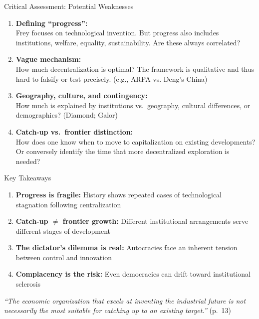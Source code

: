 \documentclass[aspectratio=169, 11pt]{beamer}
\begin{document}
\begin{frame}{Critical Assessment: Potential Weaknesses}
    \begin{enumerate}
        \item \textbf{Defining ``progress'':} \\
        \small Frey focuses on technological invention. But progress also includes institutions, welfare, equality, sustainability. Are these always correlated?

        \item \textbf{Vague mechanism:} \\
        \small How much decentralization is optimal? The framework is qualitative and thus hard to falsify or test precisely. (e.g., ARPA vs. Deng's China)

        \item \textbf{Geography, culture, and contingency:} \\
        \small How much is explained by institutions vs.\ geography, cultural differences, or demographics? (Diamond; Galor)

        \item \textbf{Catch-up vs.\ frontier distinction:} \\
        \small How does one know when to move to capitalization on existing developments? Or conversely identify the time that more decentralized exploration is needed?
    \end{enumerate}
\end{frame}



\begin{frame}{Key Takeaways}
    \begin{enumerate}
        \item \textbf{Progress is fragile:} History shows repeated cases of technological stagnation following centralization
        \item \textbf{Catch-up $\neq$ frontier growth:} Different institutional arrangements serve different stages of development
        \item \textbf{The dictator's dilemma is real:} Autocracies face an inherent tension between control and innovation
        \item \textbf{Complacency is the risk:} Even democracies can drift toward institutional sclerosis
    \end{enumerate}

    \vspace{1em}

    \begin{center}
        \textit{``The economic organization that excels at inventing the industrial future is not necessarily the most suitable for catching up to an existing target.''} (p.\ 13)
    \end{center}
\end{frame}
\end{document}
